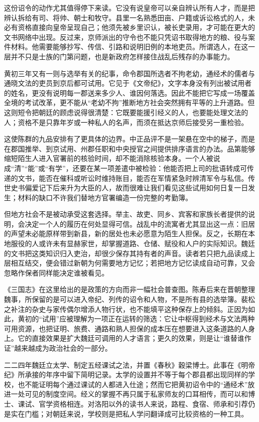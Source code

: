 这份诏令的动作尤其值得停下来读。它没有说皇帝可以亲自辨认所有人才，而是把辨认拆给有司、将帅、朝士和牧守。县里一名熟悉田亩、户籍或诉讼格式的人，未必有资格直接向皇帝呈现自己；他须先被乡里识认，被长吏录用，才可能在更大的文书网络中出现。反过来，京师派出的守令也不能只凭诏书取得地方的粮、役与案件材料。他需要能够抄写、传信、引路和说明旧例的本地吏员。所谓选人，在这一层并不只是士族的门第问题，也是新政府怎样接住战乱后残存的办事能力。

黄初三年又有一则与选举有关的纪事，命令郡国所选者不拘老幼，通经术的儒者与通晓文法的吏员到京后都可试用。它见于《文帝纪》，文字本身没有列出被试用者的姓名，更没有说明每一郡送来多少人、谁因何落选。因此不能把它写成一场覆盖全境的考试改革，更不能从“老幼不拘”推断地方社会突然拥有平等的上升道路。但这则短令把朝廷的顾虑说得很清楚：它既要能援引经义的人，也要能处理文法的人；资格不是只靠年岁或一种私人的名声，而须在抵达京师后接受另一重检验。

这使陈群的九品安排有了更具体的边界。中正品评不是一架悬在空中的梯子，而是在郡国推举、到京试用、州郡任职和中央授官之间提供排序语言的办法。品第能够缩短陌生人进入官署前的核验时间，却不能消除核验本身。一个人被说成“清”“能”或“有学”，还要在某一项差遣中被检验：他能否把上司的批语转成可传递的文书，能否在催科或听讼时维持账目，能否在军情紧急时辨清军令与私信。传世史书偏爱记下后来升为大臣的人，故而很难让我们看见这些试用如何日复一日发生；材料的缺口不许我们替地方官署编造一份完整的考勤簿。

但地方社会不是被动承受这套选择。举主、故吏、同乡、宾客和家族长者提供的说明，会决定一个人的履历在何处显得可信。战乱中的流寓者尤其显出这一点：旧居的声望未必能原样带到新县，新的居处也未必愿意为陌生人担保。反之，长期在本地服役的人或许未有显赫家世，却掌握道路、仓储、赋役和人户的实际知识。魏廷的文书把这类知识归入吏治，却很少保存其持有者的声音。读者若只把九品读成上层相互结交，便会错过新朝为何需要地方记忆；若把地方记忆读成自动可靠，又会忽略作保者同样能决定谁被看见。

《三国志》在这里给出的是政策的方向而非一幅社会普查图。陈寿后来在晋朝整理魏事，所保留的是可以进入帝纪、列传的诏令和人物，不是所有县的选举簿。裴松之补注的杂史与家传偶尔增添人物行状，也不能填平这种保存上的倾斜。正因为如此，黄初的“试用”应被理解为一项正在运转的筛选：它让中枢得到经术与文法两种可用资源，也把证明、旅费、通路和熟人担保的成本压在想要进入这条道路的人身上。它的直接效果是扩大魏廷可调用的人才语言；更久的效果，则是让“谁替谁作证”越来越成为政治社会的一部分。

二二四年魏廷立太学、制定五经课试之法，并置《春秋》穀梁博士。此事在《明帝纪》所承接的年序中留下简明记录。太学的设置并不等于每个郡县都出现同样的学校，也不能证明每个通过课试的人都进入仕途；然而它把黄初诏令中的“通经术”放进一处可见的制度空间。经义的掌握不再只属于私家师友的口耳相传，而可以和博士、课试、官学资格相连。对洛阳以外的读书人来说，路程、食宿、师承和引荐仍是实在门槛；对朝廷来说，学校则是把私人学问翻译成可比较资格的一种工具。

